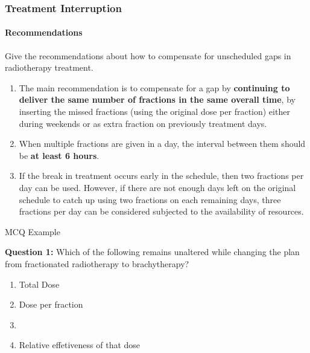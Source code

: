 \documentclass{beamer}
\begin{document}
\begin{frame}
  \frametitle{Treatment Interruption}
  \framesubtitle{Recommendations}

  \begin{block}{Give the recommendations about how to compensate for  unscheduled gaps in radiotherapy treatment.}
    \begin{enumerate}
      \item The main recommendation is to compensate for a gap by  \textbf{continuing to deliver the same number of fractions in the same overall time}, by inserting the missed fractions (using the original dose per fraction) either during weekends or as extra fraction on previously treatment days.
      \item When multiple fractions are given in a day, the interval between them should be \textbf{at least 6 hours}.
      \item If the break in treatment occurs early in the schedule, then two fractions per day can be used. However, if there are not enough days left on the original schedule to catch up using two fractions on each remaining days, three fractions per day can be considered subjected to the availability of resources.
    \end{enumerate}
   
  \end{block}
\end{frame}

\begin{frame}{MCQ Example}

\textbf{Question 1:} Which of the following remains unaltered while changing the plan from fractionated radiotherapy to brachytherapy?

\begin{enumerate}
    \item Total Dose
    \item Dose per fraction
    \item {}
    \item Relative effetiveness of that dose
\end{enumerate}
\end{frame}
\end{document}
